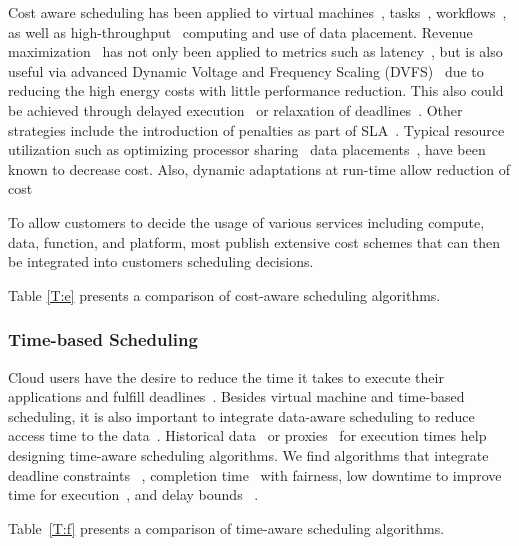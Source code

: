 \documentclass[final,5p,times,twocolumn]{elsarticle}
\begin{document}
Cost aware scheduling has been applied to virtual machines~\cite{yuan2017ttsa}, tasks~\cite{yuan2017temporal,zuo2015multi}, workflows~\cite{arabnejad2015cost,arabnejad2016budget}, as well as high-throughput~\cite{yuan2016cawsac} computing and use of data placement. Revenue maximization~\cite{yuan2018warm} has not only been applied to metrics such as latency~\cite{ghahramani2017toward}, but is also useful via advanced Dynamic Voltage and Frequency Scaling (DVFS)~\cite{las10cloudsched,calheiros2014energy} due to reducing the high energy costs with little performance reduction. This also could be achieved through delayed execution~\cite{bi2016trs} or relaxation of deadlines~\cite{zhang2018dynamic}. Other strategies include the introduction of penalties as part of SLA~\cite{wu2012sla}. Typical resource utilization such as optimizing processor sharing~\cite{lee2012profit} data placements~\cite{lee2012profit}, have been known to decrease cost. Also, dynamic adaptations at run-time allow reduction of cost~\cite{ari2013design}

To allow customers to decide the usage of various services including compute, data, function, and platform, most publish extensive cost schemes that can then be integrated into customers scheduling decisions.

Table \ref{T:e} presents a comparison of cost-aware scheduling algorithms.

%

\subsubsection{Time-based Scheduling}\label{sec:time}


Cloud users have the desire to reduce the time it takes to execute their applications and fulfill deadlines~\cite{arabnejad2017scheduling}. Besides virtual machine and time-based scheduling, it is also important to integrate data-aware scheduling to reduce access time to the data~\cite{vandenbosshe2013}. Historical data~\cite{thomas2015credit} or proxies~\cite{erdil2013autonomic} for execution times help designing time-aware scheduling algorithms. We find algorithms that integrate deadline constraints ~\cite{li2016energy}, completion time~\cite{xu2011job} with fairness, low downtime to improve time for execution~\cite{frincu2014scheduling}, and delay bounds ~\cite{yuan2017time}.

Table~\ref{T:f} presents a comparison of time-aware scheduling algorithms.
\end{document}
